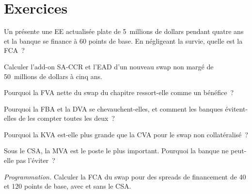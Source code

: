 \section{Exercices}

\begin{exercise}[$\star$]\label{exo:rc:funding-margin-and-capital-adjustments:1}
Un  présente une EE actualisée plate de 5~millions de dollars pendant quatre ans et la banque se finance à
60 points de base. En négligeant la survie, quelle est la FCA~?
\end{exercise}

\begin{exercise}[$\star$]\label{exo:rc:funding-margin-and-capital-adjustments:2}
Calculer l'add-on SA-CCR et l'EAD d'un nouveau swap non margé de 50~millions de dollars à cinq ans.
\end{exercise}

\begin{exercise}[$\star$]\label{exo:rc:funding-margin-and-capital-adjustments:3}
Pourquoi la FVA nette du swap du chapitre ressort-elle comme un bénéfice~?
\end{exercise}

\begin{exercise}[$\star\star$]\label{exo:rc:funding-margin-and-capital-adjustments:4}
Pourquoi la FBA et la DVA se chevauchent-elles, et comment les banques évitent-elles de les compter toutes les deux~?
\end{exercise}

\begin{exercise}[$\star\star$]\label{exo:rc:funding-margin-and-capital-adjustments:5}
Pourquoi la KVA est-elle plus grande que la CVA pour le swap non collatéralisé~?
\end{exercise}

\begin{exercise}[$\star\star$]\label{exo:rc:funding-margin-and-capital-adjustments:6}
Sous le CSA, la MVA est le poste le plus important. Pourquoi la banque ne peut-elle pas l'éviter~?
\end{exercise}

\begin{exercise}[$\star\star\star$]\label{exo:rc:funding-margin-and-capital-adjustments:7}
\emph{Programmation.} Calculer la FCA du swap pour des spreads de financement de 40 et 120 points de base,
avec et sans le CSA.
\end{exercise}

